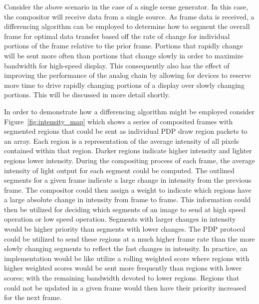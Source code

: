     Consider the above scenario in the case of a single scene generator. In this case, the compositor will receive data from a single source. As frame data is received, a differencing algorithm can be employed to determine how to segment the overall frame for optimal data transfer based off the rate of change for individual portions of the frame relative to the prior frame. Portions that rapidly change will be sent more often than portions that change slowly in order to maximize bandwidth for high-speed display. This consequently also has the effect of improving the performance of the analog chain by allowing for devices to reserve more time to drive rapidly changing portions of a display over slowly changing portions. This will be discussed in more detail shortly.

    In order to demonstrate how a differencing algorithm might be employed consider Figure~\ref{fig:intensity_map} which shows a series of composited frames with segmented regions that could be sent as individual PDP draw region packets to an array. Each region is a representation of the average intensity of all pixels contained within that region. Darker regions indicate higher intensity and lighter regions lower intensity. During the compositing process of each frame, the average intensity of light output for each segment could be computed. The outlined segments for a given frame indicate a large change in intensity from the previous frame. The compositor could then assign a weight to indicate which regions have a large absolute change in intensity from frame to frame. This information could then be utilized for deciding which segments of an image to send at high speed operation or low speed operation. Segments with larger changes in intensity would be higher priority than segments with lower changes. The PDP protocol could be utilized to send these regions at a much higher frame rate than the more slowly changing segments to reflect the fast changes in intensity. In practice, an implementation would be like utilize a rolling weighted score where regions with higher weighted scores would be sent more frequently than regions with lower scores; with the remaining bandwidth devoted to lower regions. Regions that could not be updated in a given frame would then have their priority increased for the next frame.

